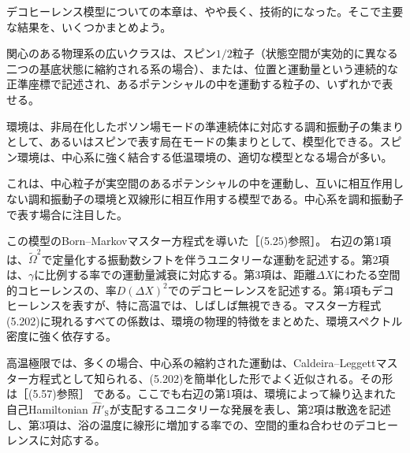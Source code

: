 
デコヒーレンス模型についての本章は、やや長く、技術的になった。そこで主要な結果を、いくつかまとめよう。

\hypertarget{srcpage:238}{}\label{srcpage:238}
関心のある物理系の広いクラスは、スピン$1/2$粒子（状態空間が実効的に異なる二つの基底状態に縮約される系の場合）、または、位置と運動量という連続的な正準座標で記述され、あるポテンシャルの中を運動する粒子の、いずれかで表せる。

環境は、非局在化したボソン場モードの準連続体に対応する調和振動子の集まりとして、あるいはスピンで表す局在モードの集まりとして、模型化できる。スピン環境は、中心系に強く結合する低温環境の、適切な模型となる場合が多い。

これは、中心粒子が実空間のあるポテンシャルの中を運動し、互いに相互作用しない調和振動子の環境と双線形に相互作用する模型である。中心系を調和振動子で表す場合に注目した。

この模型のBorn--Markovマスター方程式を導いた［(5.25)参照］。
右辺の第1項は、$\widetilde\Omega^2$で定量化する振動数シフトを伴うユニタリーな運動を記述する。第2項は、$\gamma$に比例する率での運動量減衰に対応する。第3項は、距離$\Delta X$にわたる空間的コヒーレンスの、率$D(\Delta X)^2$でのデコヒーレンスを記述する。第4項もデコヒーレンスを表すが、特に高温では、しばしば無視できる。マスター方程式(5.202)に現れるすべての係数は、環境の物理的特徴をまとめた、環境スペクトル密度に強く依存する。

高温極限では、多くの場合、中心系の縮約された運動は、Caldeira--Leggettマスター方程式として知られる、(5.202)を簡単化した形でよく近似される。その形は［(5.57)参照］
である。ここでも右辺の第1項は、環境によって繰り込まれた自己Hamiltonian $\hat H'_{\mathrm S}$が支配するユニタリーな発展を表し、第2項は散逸を記述し、第3項は、浴の温度に線形に増加する率での、空間的重ね合わせのデコヒーレンスに対応する。

